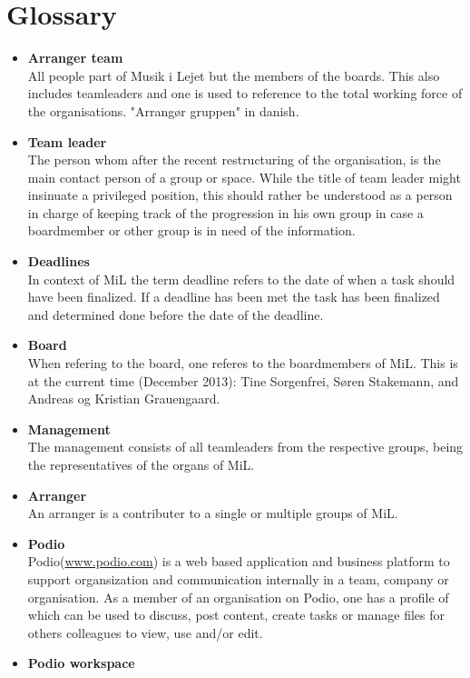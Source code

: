 \section{Glossary}
\begin{itemize}
	\item \textbf{Arranger team}\\
	All people part of Musik i Lejet but the members of the boards. This also includes teamleaders and one is used to reference to the total working force of the organisations. "Arrangør gruppen" in danish.
	\item \textbf{Team leader}\\
	The person whom after the recent restructuring of the organisation, is the main contact person of a group or space. While the title of team leader might insinuate a privileged position, this should rather be understood as a person in charge of keeping track of the progression in his own group in case a boardmember or other group is in need of the information.
	\item \textbf{Deadlines}\\
	In context of MiL the term deadline refers to the date of when a task should have been finalized. If a deadline has been met the task has been finalized and determined done before the date of the deadline.
	\item \textbf{Board}\\
	When refering to the board, one referes to the boardmembers of MiL. This is at the current time (December 2013): Tine Sorgenfrei, Søren Stakemann, and Andreas og Kristian Grauengaard.
	\item \textbf{Management}\\
	The management consists of all teamleaders from the respective groups, being the representatives of the organs of MiL.
	\item \textbf{Arranger}\\
	An arranger is a contributer to a single or multiple groups of MiL.
	\item \textbf{Podio}\\
	Podio(\href{www.podio.com}{www.podio.com}) is a web based application and business platform to support organsization and communication internally in a team, company or organisation. As a member of an organisation on Podio, one has a profile of which can be used to discuss, post content, create tasks or manage files for others colleagues to view, use and/or edit.
	\item \textbf{Podio workspace} \\

\end{itemize}
